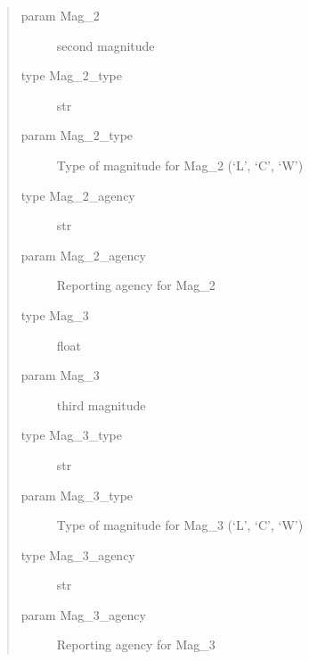 \documentclass[a4paper,10pt,english]{sphinxmanual}
\begin{document}
\begin{fulllineitems}
\begin{description}
\begin{quote}
\begin{description}
\item[{param Mag\_2}] \leavevmode
second magnitude

\item[{type Mag\_2\_type}] \leavevmode
str

\item[{param Mag\_2\_type}] \leavevmode
Type of magnitude for Mag\_2 (`L', `C', `W')

\item[{type Mag\_2\_agency}] \leavevmode
str

\item[{param Mag\_2\_agency}] \leavevmode
Reporting agency for Mag\_2

\item[{type Mag\_3}] \leavevmode
float

\item[{param Mag\_3}] \leavevmode
third magnitude

\item[{type Mag\_3\_type}] \leavevmode
str

\item[{param Mag\_3\_type}] \leavevmode
Type of magnitude for Mag\_3 (`L', `C', `W')

\item[{type Mag\_3\_agency}] \leavevmode
str

\item[{param Mag\_3\_agency}] \leavevmode
Reporting agency for Mag\_3

\end{description}\end{quote}

\end{description}

\end{fulllineitems}

\end{document}
